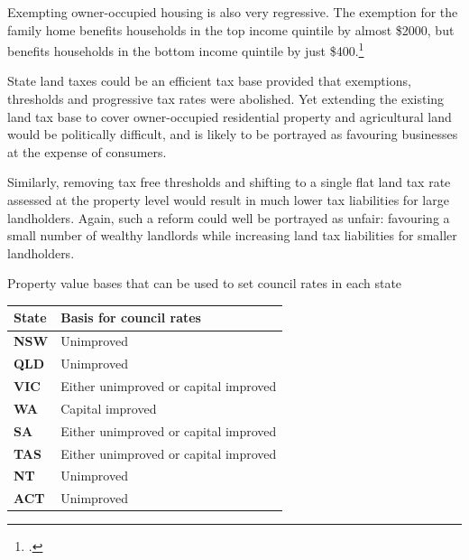 \documentclass[twoside,english]{Dianab5ona4portrait}
\begin{document}
Exempting owner-occupied housing is also very regressive. The exemption for the family home benefits households in the top income quintile by almost \$2000, but benefits households in the bottom income quintile by just \$400.\footcite[][27]{KellyMaresHarrisonEtAl2013}   

State land taxes could be an efficient tax base provided that exemptions, thresholds and progressive tax rates were abolished. Yet extending the existing land tax base to cover owner-occupied residential property and agricultural land would be politically difficult, and is likely to be portrayed as favouring businesses at the expense of consumers.

Similarly, removing tax free thresholds and shifting to a single flat land tax rate assessed at the property level would result in much lower tax liabilities for large landholders. Again, such a reform could well be portrayed as unfair: favouring a small number of wealthy landlords while increasing land tax liabilities for smaller landholders. 

\begin{table}
%
{Property value bases that can be used to set council rates in each state}
\begin{tabularx}{\columnwidth}{>{\bfseries}lX}
%
\toprule
\textbf{State} & \textbf{Basis for council rates} \\%
\midrule
\textbf{NSW} & Unimproved  \\[0.5\baselineskip]
\textbf{QLD} & Unimproved  \\[0.5\baselineskip]
\textbf{VIC} & Either unimproved or capital improved  \\[0.5\baselineskip]
\textbf{WA} & Capital improved  \\[0.5\baselineskip]
\textbf{SA} & Either unimproved or capital improved \\[0.5\baselineskip]
\textbf{TAS} & Either unimproved or capital improved  \\[0.5\baselineskip]
\textbf{NT} & Unimproved  \\[0.5\baselineskip]
\textbf{ACT} & Unimproved  \\%
\bottomrule
\end{tabularx}

\end{table}
\end{document}
